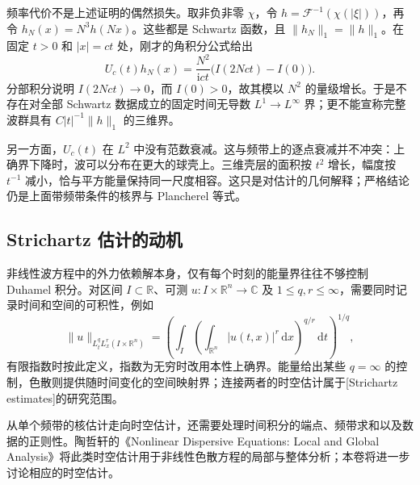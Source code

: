频率代价不是上述证明的偶然损失。取非负非零 \(\chi\)，令 \(h=\mathcal F^{-1}(\chi(|\xi|))\)，再令 \(h_N(x)=N^3h(Nx)\)。这些都是 Schwartz 函数，且 \(\|h_N\|_1=\|h\|_1\)。在固定 \(t>0\) 和 \(|x|=ct\) 处，刚才的角积分公式给出
\[
 U_c(t)h_N(x)=\dfrac{N^2}{\mathrm{i}ct}
                    \bigl(I(2Nct)-I(0)\bigr).
\]
分部积分说明 \(I(2Nct)\to0\)，而 \(I(0)>0\)，故其模以 \(N^2\) 的量级增长。于是不存在对全部 Schwartz 数据成立的固定时间无导数 \(L^1\to L^\infty\) 界；更不能宣称完整波群具有 \(C|t|^{-1}\|h\|_1\) 的三维界。

\ProseParagraphBreak

另一方面，\(U_c(t)\) 在 \(L^2\) 中没有范数衰减。这与频带上的逐点衰减并不冲突：上确界下降时，波可以分布在更大的球壳上。三维壳层的面积按 \(t^2\) 增长，幅度按 \(t^{-1}\) 减小，恰与平方能量保持同一尺度相容。这只是对估计的几何解释；严格结论仍是上面带频带条件的核界与 Plancherel 等式。

\subsection{Strichartz 估计的动机}
\label{b2:subsec:110403}

非线性波方程中的外力依赖解本身，仅有每个时刻的能量界往往不够控制 Duhamel 积分。对区间 \(I\subset\mathbb R\)、可测 \(u:I\times\mathbb R^n\to\mathbb C\) 及 \(1\le q,r\le\infty\)，需要同时记录时间和空间的可积性，例如
\[
 \|u\|_{L^q_tL^r_x(I\times\mathbb R^n)}
 =\left(\int_I\left(\int_{\mathbb R^n}|u(t,x)|^r\,\mathrm{d}x\right)^{q/r}
 \,\mathrm{d}t\right)^{1/q},
\]
有限指数时按此定义，指数为无穷时改用本性上确界。能量给出某些 \(q=\infty\) 的控制，色散则提供随时间变化的空间映射界；连接两者的时空估计属于[Strichartz estimates]的研究范围。

\ProseParagraphBreak

从单个频带的核估计走向时空估计，还需要处理时间积分的端点、频带求和以及数据的正则性。陶哲轩的《Nonlinear Dispersive Equations: Local and Global Analysis》\cite[Section 2.3]{Tao2006Nonlinear}将此类时空估计用于非线性色散方程的局部与整体分析；本卷将进一步讨论相应的时空估计。

